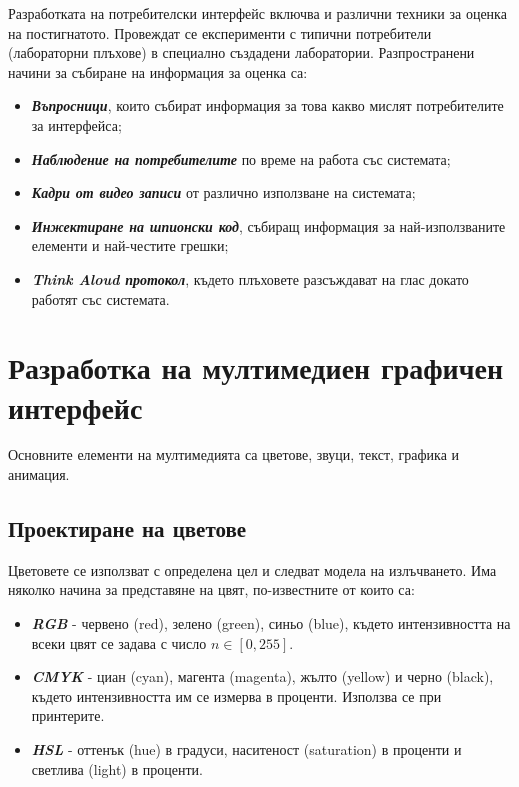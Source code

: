 \documentclass[fleqn,12pt]{article}
\begin{document}
Разработката на потребителски интерфейс включва и различни техники за оценка на постигнатото.
Провеждат се експерименти с типични потребители (лабораторни плъхове) в специално създадени лаборатории.
\bigbreak
Разпространени начини за събиране на информация за оценка са:
\begin{itemize}
    \item \textbf{\textit{Въпросници}}, които събират информация за това какво мислят потребителите за интерфейса;
    \item \textbf{\textit{Наблюдение на потребителите}} по време на работа със системата;
    \item \textbf{\textit{Кадри от видео записи}} от различно използване на системата;
    \item \textbf{\textit{Инжектиране на шпионски код}}, събиращ информация за най-използваните елементи и най-честите грешки;
    \item \textbf{\textit{Think Aloud протокол}}, където плъховете разсъждават на глас докато работят със системата.
\end{itemize}

\section{Разработка на мултимедиен графичен интерфейс}

Основните елементи на мултимедията са цветове, звуци, текст, графика и анимация.

\subsection{Проектиране на цветове}

Цветовете се използват с определена цел и следват модела на излъчването.
Има няколко начина за представяне на цвят, по-известните от които са:
\begin{itemize}
    \item \textbf{\textit{RGB}} - червено (red), зелено (green), синьо (blue), където интензивността на всеки цвят се задава с число $n \in [0, 255]$.
    \item \textbf{\textit{CMYK}} - циан (cyan), магента (magenta), жълто (yellow) и черно (black), където интензивността им се измерва в проценти.
    Използва се при принтерите.
    \item \textbf{\textit{HSL}} - оттенък (hue) в градуси, наситеност (saturation) в проценти и светлива (light) в проценти.
\end{itemize}
\end{document}
